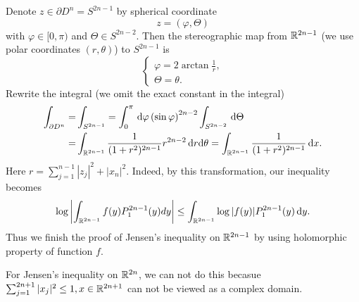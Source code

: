 Denote $z\in \partial D^{n}=S^{2n-1}$ by spherical coordinate
\[
z=\left( \varphi,\Theta \right) 
\] 
with $\varphi \in [0,\pi)$ and $\Theta \in S^{2n-2}$. Then the stereographic map from  $\mathbb{R}^{2n-1}$ (we use polar coordinates $(r,\theta )$) to $S^{2n-1}$ is
\[
\begin{cases}
	\varphi=2 \arctan \frac{1}{r},\\
	\Theta=\theta. 
\end{cases}
\] 
Rewrite the integral (we omit the exact constant in the integral)
\begin{equation*}
	\begin{aligned}
		\int_{\partial D^{n}}=&\int_{S^{2n-1}}=\int_0^{\pi}\,\mathrm{d}\varphi  \left( \sin \varphi \right) ^{2n-2}\int_{S^{2n-2}}\,\mathrm{d} \Theta\\
		=& \int_{\mathbb{R}^{2n-1}}\frac{1}{(1+r^2)^{2n-1}}r^{2n-2}\,\mathrm{d} r \mathrm{d}\theta=\int_{\mathbb{R}^{2n-1}}\frac{1}{(1+r^2)^{2n-1}}\,\mathrm{d} x.
\end{aligned}
\end{equation*}
Here $r=\sum_{j=1}^{n-1} |z_j|^2+|x_n|^2$. Indeed, by this transformation, our inequality becomes
\[
\log \left|\int_{\mathbb{R}^{2n-1}}f(y)P^{2n-1}_1(y)d y\right|\le \int_{\mathbb{R}^{2n-1}} \log|f(y)|P^{2n-1}_1(y)\,\mathrm{d} y.
\]
Thus we finish the proof of Jensen's inequality on $\mathbb{R}^{2n-1}$ by using holomorphic property of function $f$.

For Jensen's inequality on $\mathbb{R}^{2n}$, we can not do this becasue $\sum_{j=1}^{2n+1} |x_j|^2\le 1, x \in  \mathbb{R}^{2n+1}$ can not be viewed as a complex domain. 
